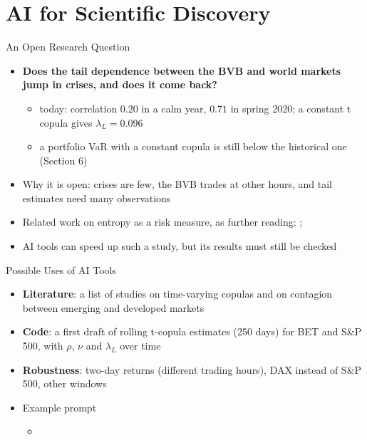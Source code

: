 \section{AI for Scientific Discovery}

\begin{frame}{An Open Research Question}
\itemsize{\small}
\begin{itemize}
    \item \textbf{Does the tail dependence between the BVB and world markets jump in crises, and does it come back?}
    \begin{itemize}
        \item today: correlation $0.20$ in a calm year, $0.71$ in spring 2020; a constant t copula gives $\lambda_L = 0.096$
        \item a portfolio VaR with a constant copula is still below the historical one (Section 6)
    \end{itemize}
    \item Why it is open: crises are few, the BVB trades at other hours, and tail estimates need many observations
    \item Related work on entropy as a risk measure, as further reading: ; 
    \item AI tools can speed up such a study, but its results must still be checked 
\end{itemize}
\end{frame}

\begin{frame}{Possible Uses of AI Tools}
\itemsize{\small}
\begin{itemize}
    \item \textbf{Literature}: a list of studies on time-varying copulas and on contagion between emerging and developed markets
    \item \textbf{Code}: a first draft of rolling t-copula estimates (250 days) for BET and S\&P 500, with $\rho$, $\nu$ and $\lambda_L$ over time
    \item \textbf{Robustness}: two-day returns (different trading hours), DAX instead of S\&P 500, other windows
    \item Example prompt
    \begin{itemize}
        \item {}
    \end{itemize}
\end{itemize}
\end{frame}


